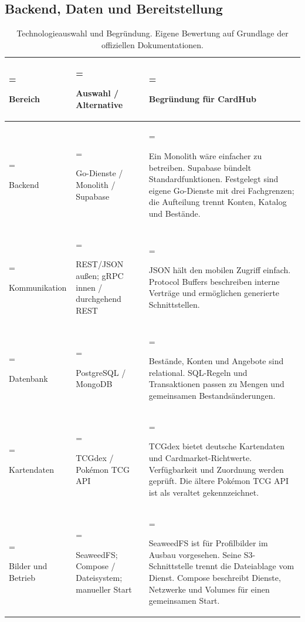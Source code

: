 \subsection{Backend, Daten und Bereitstellung}
\begin{table}[H]
\centering
\small
\begin{tabularx}{\linewidth}{@{}>{\hsize=0.63\hsize\linewidth=\hsize\raggedright\arraybackslash}X >{\hsize=0.8699999999999999\hsize\linewidth=\hsize\raggedright\arraybackslash}X >{\hsize=1.5\hsize\linewidth=\hsize\raggedright\arraybackslash}X@{}}
\toprule
\textbf{Bereich} & \textbf{Auswahl / Alternative} & \textbf{Begründung für CardHub} \\
\midrule
Backend & Go-Dienste / Monolith / Supabase & Ein Monolith wäre einfacher zu betreiben. Supabase bündelt Standardfunktionen. Festgelegt sind eigene Go-Dienste mit drei Fachgrenzen; die Aufteilung trennt Konten, Katalog und Bestände. \\
Kommunikation & REST/JSON außen; gRPC innen / durchgehend REST & JSON hält den mobilen Zugriff einfach. Protocol Buffers beschreiben interne Verträge und ermöglichen generierte Schnittstellen. \\
Datenbank & PostgreSQL / MongoDB & Bestände, Konten und Angebote sind relational. SQL-Regeln und Transaktionen passen zu Mengen und gemeinsamen Bestandsänderungen. \\
Kartendaten & TCGdex / Pokémon TCG API & TCGdex bietet deutsche Kartendaten und Cardmarket-Richtwerte. Verfügbarkeit und Zuordnung werden geprüft. Die ältere Pokémon TCG API ist als veraltet gekennzeichnet. \\
Bilder und Betrieb & SeaweedFS; Compose / Dateisystem; manueller Start & SeaweedFS ist für Profilbilder im Ausbau vorgesehen. Seine S3-Schnittstelle trennt die Dateiablage vom Dienst. Compose beschreibt Dienste, Netzwerke und Volumes für einen gemeinsamen Start. \\
\bottomrule
\end{tabularx}
\caption{Technologieauswahl und Begründung. Eigene Bewertung auf Grundlage der offiziellen Dokumentationen. \cite{grpc,postgres,tcgdex,preise,alteapi,seaweed,compose}}
\end{table}
